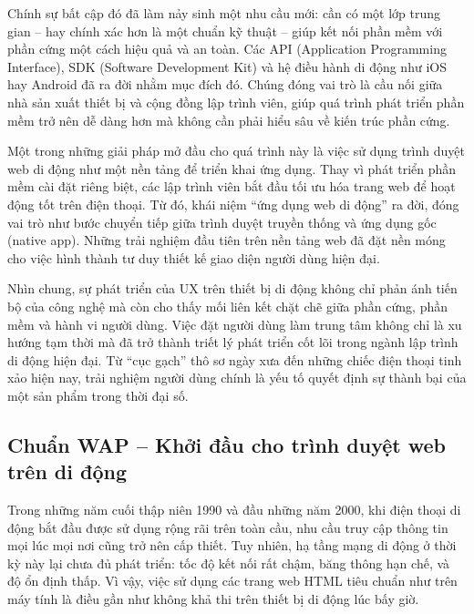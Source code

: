     \vspace{0.5em}
  
    \hspace*{0.8cm}Chính sự bất cập đó đã làm nảy sinh một nhu cầu mới: cần có một lớp trung gian – hay chính xác hơn là một chuẩn kỹ thuật – giúp kết nối phần mềm với phần cứng một cách hiệu quả và an toàn. Các API (Application Programming Interface), SDK (Software Development Kit) và hệ điều hành di động như iOS hay Android đã ra đời nhằm mục đích đó. Chúng đóng vai trò là cầu nối giữa nhà sản xuất thiết bị và cộng đồng lập trình viên, giúp quá trình phát triển phần mềm trở nên dễ dàng hơn mà không cần phải hiểu sâu về kiến trúc phần cứng.
  
    \vspace{0.5em}
  
    \hspace*{0.8cm}Một trong những giải pháp mở đầu cho quá trình này là việc sử dụng trình duyệt web di động như một nền tảng để triển khai ứng dụng. Thay vì phát triển phần mềm cài đặt riêng biệt, các lập trình viên bắt đầu tối ưu hóa trang web để hoạt động tốt trên điện thoại. Từ đó, khái niệm “ứng dụng web di động” ra đời, đóng vai trò như bước chuyển tiếp giữa trình duyệt truyền thống và ứng dụng gốc (native app). Những trải nghiệm đầu tiên trên nền tảng web đã đặt nền móng cho việc hình thành tư duy thiết kế giao diện người dùng hiện đại.
  
    \vspace{0.5em}
  
    \hspace*{0.8cm}Nhìn chung, sự phát triển của UX trên thiết bị di động không chỉ phản ánh tiến bộ của công nghệ mà còn cho thấy mối liên kết chặt chẽ giữa phần cứng, phần mềm và hành vi người dùng. Việc đặt người dùng làm trung tâm không chỉ là xu hướng tạm thời mà đã trở thành triết lý phát triển cốt lõi trong ngành lập trình di động hiện đại. Từ “cục gạch” thô sơ ngày xưa đến những chiếc điện thoại tinh xảo hiện nay, trải nghiệm người dùng chính là yếu tố quyết định sự thành bại của một sản phẩm trong thời đại số.
  

\subsection{Chuẩn WAP – Khởi đầu cho trình duyệt web trên di động}
\renewcommand{\labelitemi}{--}    

  \hspace*{0.8cm}Trong những năm cuối thập niên 1990 và đầu những năm 2000, khi điện thoại di động bắt đầu được sử dụng rộng rãi trên toàn cầu, nhu cầu truy cập thông tin mọi lúc mọi nơi cũng trở nên cấp thiết. Tuy nhiên, hạ tầng mạng di động ở thời kỳ này lại chưa đủ phát triển: tốc độ kết nối rất chậm, băng thông hạn chế, và độ ổn định thấp. Vì vậy, việc sử dụng các trang web HTML tiêu chuẩn như trên máy tính là điều gần như không khả thi trên thiết bị di động lúc bấy giờ.
  
